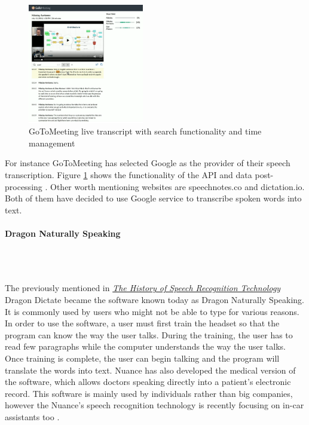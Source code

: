 \documentclass{article}
\newcommand{\subsubsubsection}[1]{\paragraph{#1}\mbox{}\\}
\begin{document}
{\large
\begin{figure}
  \vspace{-25pt}
  \begin{center}
    \includegraphics[width=0.45\textwidth]{img/gotomeeting.png}
  \end{center}
  \vspace{-20pt}
  \caption{GoToMeeting live transcript with search functionality and time management}
  \label{fig:gotomeeting}
  \vspace{-10pt}
\end{figure}
For instance GoToMeeting has selected Google as the provider of their speech transcription. Figure \ref{fig:gotomeeting} shows the functionality of the API and data post-processing \parencite{googleyt}. Other worth mentioning websites are speechnotes.co and dictation.io. Both of them have decided to use Google service to transcribe spoken words into text.\par
}
\vspace{40pt}
\subsubsubsection{Dragon Naturally Speaking}
\\
{\large
The previously mentioned in \hyperref[sec:dragon]{\textit{The History of Speech Recognition Technology}} Dragon Dictate became the software known today as Dragon Naturally Speaking. It is commonly used by users who might not be able to type for various reasons. In order to use the software, a user must first train the headset so that the program can know the way the user talks. During the training, the user has to read few paragraphs while the computer understands the way the user talks. Once training is complete, the user can begin talking and the program will translate the words into text. Nuance has also developed the medical version of the software, which allows doctors speaking directly into a patient’s electronic record. This software is mainly used by individuals rather than big companies, however the Nuance's speech recognition technology is recently focusing on in-car assistants too \parencite{dragoncar}.
\par
}
\end{document}
